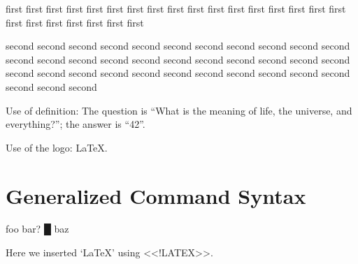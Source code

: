 





\mktsShowpar\par
\begin{multicols}{2}first first first first first first
first first first first first first first first first
first first first first first first first first first\mktsShowpar\par
second second second second second second second second second
second second second second second second second second second
second second second second second second second second second
second second second second second second second second second
\mktsShowpar\par
Use of definition: The question is “{\mktsStyleItalic{}What is the meaning of life,
the universe, and everything?\/}”; the
answer is “{\mktsStyleBold{}42}”.\mktsShowpar\par
\end{multicols}Use of the logo: \LaTeX{}.\mktsShowpar\par

\section{Generalized Command Syntax
}
foo {\mktsStyleBold\color{violet}{\mktsStyleSymbol}bar? {\mktsStyleSymbol█}} baz\mktsShowpar\par
Here we inserted ‘\LaTeX{}’ using {\mktsStyleCode{}<<!LATEX>>}.\mktsShowpar\par


